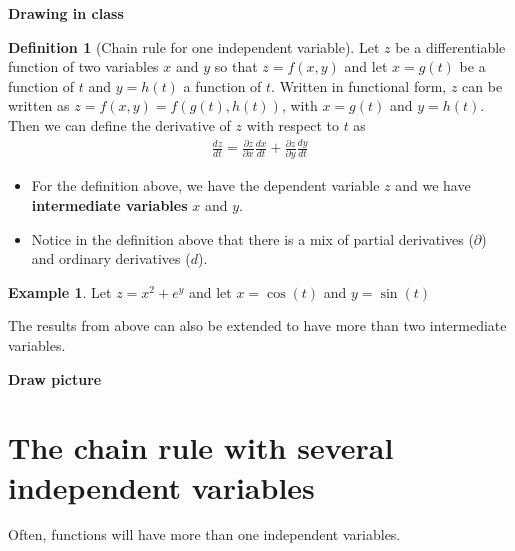 \documentclass[
]{book}
\theoremstyle{definition}
\newtheorem{definition}{Definition}[chapter]
\theoremstyle{definition}
\newtheorem{example}{Example}[chapter]
\theoremstyle{definition}
\theoremstyle{definition}
\theoremstyle{remark}
\begin{document}
\textbf{Drawing in class}

\begin{definition}[Chain rule for one independent variable]

Let \(z\) be a differentiable function of two variables \(x\) and \(y\) so that \(z = f(x, y)\) and let \(x=g(t)\) be a function of \(t\) and \(y=h(t)\) a function of \(t\). Written in functional form, \(z\) can be written as \(z = f(x, y) = f(g(t), h(t))\), with \(x=g(t)\) and \(y=h(t)\). Then we can define the derivative of \(z\) with respect to \(t\) as
\[
\begin{aligned}
\frac{dz}{dt} = \frac{\partial z}{ \partial x}\frac{dx}{dt} + \frac{\partial z}{\partial y}\frac{dy}{dt}
\end{aligned}
\]

\begin{itemize}
\item
  For the definition above, we have the dependent variable \(z\) and we have \textbf{intermediate variables} \(x\) and \(y\).
\item
  Notice in the definition above that there is a mix of partial derivatives (\(\partial\)) and ordinary derivatives (\(d\)).
\end{itemize}

\end{definition}

\begin{example}
Let \(z = x^2 + e^y\) and let \(x = \cos(t)\) and \(y = \sin(t)\)
\end{example}

The results from above can also be extended to have more than two intermediate variables.

\textbf{Draw picture}

\hypertarget{the-chain-rule-with-several-independent-variables}{%
\section{The chain rule with several independent variables}\label{the-chain-rule-with-several-independent-variables}}

Often, functions will have more than one independent variables.
\end{document}
